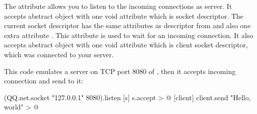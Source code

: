 \documentclass[sigplan,nonacm]{acmart}
\newcommand\aff[1]{\ff{\textcolor{gray}{\(\star\)}#1}}
\newcommand\deff[1]{\ff{\textcolor{blue!50!black}{\textbf{#1}}}}
\newcommand\adeff[1]{\aff{\textcolor{blue!50!black}{\textbf{#1}}}}
\begin{document}
The \adeff{listen} attribute allows you to listen to the incoming connections as server.
It accepts abstract object with one void attribute which is socket descriptor. The current socket descriptor has the
same attributes as descriptor from  and also one extra attribute \deff{accept}. This attribute is
used to wait for an incoming connection. It also accepts abstract object with one void attribute which is client socket descriptor,
which was connected to your server.

This code emulates a server on TCP port 8080 of , then it accepts incoming connection and send  to it:

\begin{ffcode}
(QQ.net.socket "127.0.0.1" 8080).listen
  [s]
    s.accept > @
      [client]
        client.send "Hello, world" > @
\end{ffcode}

\raggedright


\end{document}
